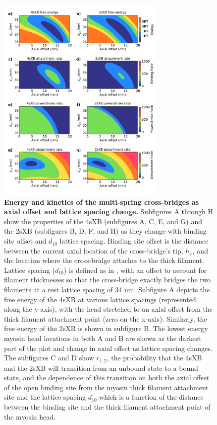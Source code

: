 \documentclass[]{article}
\begin{document}
\begin{figure}[ht]
    \begin{center}
    \includegraphics[width=3.2in]{../imgs/Figure2.pdf}
    \caption{
        \label{fig_kinetics_contours}
        \textbf{Energy and kinetics of the multi-spring cross-bridges as axial offset and lattice spacing change.} 
        Subfigures A through H show the properties of the 4sXB (subfigures A, C, E, and G) and the 2sXB (subfigures B, D, F, and H) as they change with binding site offset and $d_{10}$ lattice spacing.
        Binding site offset is the distance between the current axial location of the cross-bridge's tip, $h_x$, and the location where the cross-bridge attaches to the thick filament.
        Lattice spacing ($d_{10}$) is defined as in \citet{Millman1998}, with an offset to account for filament thicknesses so that the cross-bridge exactly bridges the two filaments at a rest lattice spacing of 34 nm.
        Subfigure A depicts the free energy of the 4sXB at various lattice spacings (represented along the y-axis), with the head stretched to an axial offset from the thick filament attachment point (zero on the x-axis).
        Similarly, the free energy of the 2sXB is shown in subfigure B.
        The lowest energy myosin head locations in both A and B are shown as the darkest part of the plot and change in axial offset as lattice spacing changes.
        The subfigures C and D show $r_{1,2}$, the probability that the 4sXB and the 2sXB will transition from an unbound state to a bound state, and the dependence of this transition on both the axial offset of the open binding site from the myosin thick filament attachment site and the lattice spacing $d_{10}$ which is a function of the distance between the binding site and the thick filament attachment point of the myosin head. 
}
\end{center}
\end{figure}
\end{document}
